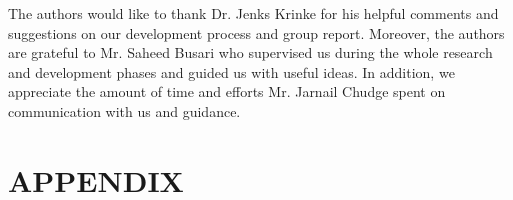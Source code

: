 \documentclass[prodmode,acmtosem]{acmsmall} %
\begin{document}


\pagebreak
\begin{acks}
The authors would like to thank Dr. Jenks Krinke for his helpful comments and suggestions on our development process and group report. Moreover, the authors are grateful to Mr. Saheed Busari who supervised us during the whole research and development phases and guided us with useful ideas. In addition, we appreciate the amount of time and efforts Mr. Jarnail Chudge spent on communication with us and guidance.
\end{acks}  






\medskip

\pagebreak
\appendix
\section*{APPENDIX} \label{Appendix}
\setcounter{section}{0}
\end{document}
